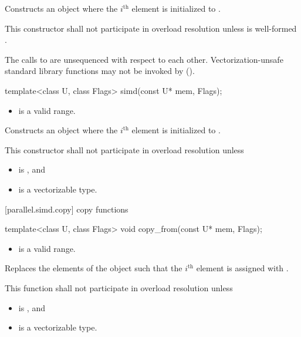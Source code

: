 \begin{itemdescr}
  \pnum\effects
  Constructs an object where the $i^\text{th}$ element is initialized to .

  \pnum\remarks
  This constructor shall not participate in overload resolution unless  is well-formed \foralli.

  \pnum
  The calls to  are unsequenced with respect to each other. Vectorization-unsafe standard library functions may not be invoked by  ().
\end{itemdescr}

\begin{itemdecl}
template<class U, class Flags> simd(const U* mem, Flags);
\end{itemdecl}

\begin{itemdescr}
  \pnum\requires
  \begin{itemize}
    \item \tcode{[mem, mem + size())} is a valid range.
  \end{itemize}

  \pnum\effects
  Constructs an object where the $i^\text{th}$ element is initialized to  \foralli.

  \pnum\remarks
  This constructor shall not participate in overload resolution unless
  \begin{itemize}
    \item {} is , and
    \item {} is a vectorizable type.
  \end{itemize}
\end{itemdescr}

[parallel.simd.copy]{ copy functions}

\begin{itemdecl}
template<class U, class Flags> void copy_from(const U* mem, Flags);
\end{itemdecl}

\begin{itemdescr}
  \pnum\requires
  \begin{itemize}
    \item \tcode{[mem, mem + size())} is a valid range.
  \end{itemize}

  \pnum\effects
  Replaces the elements of the  object such that the $i^\text{th}$ element is assigned with  \foralli.

  \pnum\remarks
  This function shall not participate in overload resolution unless
  \begin{itemize}
    \item {} is , and
    \item {} is a vectorizable type.
  \end{itemize}
\end{itemdescr}

